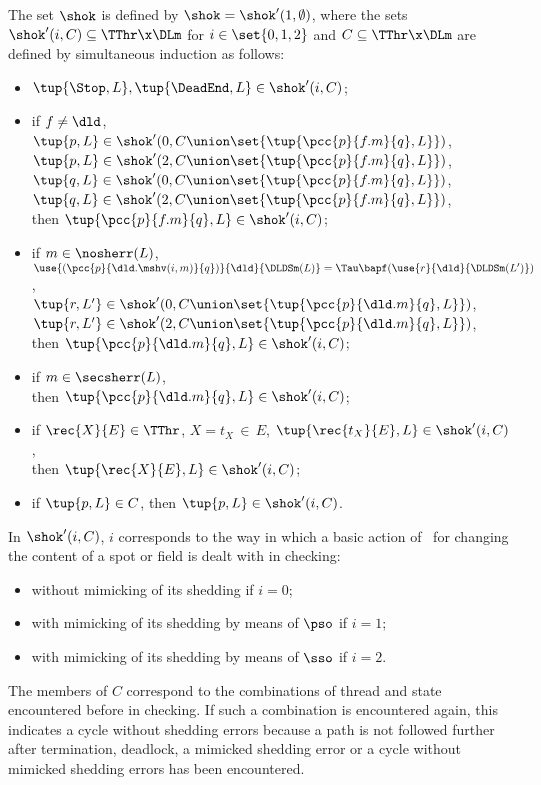 \documentclass[fleqn]{llncs}
\begin{document}
The set $\shok$ is defined by $\shok = \shok'(1,\emptyset)$, where the
sets $\shok'(i,C) \subseteq \TThr \x \DLm$ for $i \in \set{0,1,2}$ and
$C \subseteq \TThr \x \DLm$ are defined by simultaneous induction as
follows:
\begin{itemize}
\item
$\tup{\Stop,L}, \tup{\DeadEnd,L} \in \shok'(i,C)$;
\item
if $f \neq \dld$,
\\ \phantom{if}
$\tup{p,L} \in
 \shok'(0,C \union \set{\tup{\pcc{p}{f.m}{q},L}})$,
\\ \phantom{if}
$\tup{p,L} \in
 \shok'(2,C \union \set{\tup{\pcc{p}{f.m}{q},L}})$,
\\ \phantom{if}
$\tup{q,L} \in
 \shok'(0,C \union \set{\tup{\pcc{p}{f.m}{q},L}})$,
\\ \phantom{if}
$\tup{q,L} \in
 \shok'(2,C \union \set{\tup{\pcc{p}{f.m}{q},L}})$,
\\
then $\tup{\pcc{p}{f.m}{q},L} \in \shok'(i,C)$;
\item
if $m \in \nosherr(L)$,
\\ \phantom{if}
$\use{(\pcc{p}{\dld.\mshv(i,m)}{q})}{\dld}{\DLDSm(L)} =
 \Tau \bapf (\use{r}{\dld}{\DLDSm(L')})$,
\\ \phantom{if}
$\tup{r,L'} \in
 \shok'(0,C \union \set{\tup{\pcc{p}{\dld.m}{q},L}})$,
\\ \phantom{if}
$\tup{r,L'} \in
 \shok'(2,C \union \set{\tup{\pcc{p}{\dld.m}{q},L}})$,
\\
then $\tup{\pcc{p}{\dld.m}{q},L} \in \shok'(i,C)$;
\item
if $m \in \secsherr(L)$,
\\
then $\tup{\pcc{p}{\dld.m}{q},L} \in \shok'(i,C)$;
\item
if $\rec{X}{E} \in \TThr$, $X = t_X \,\in\, E$,
$\tup{\rec{t_X}{E},L} \in \shok'(i,C)$,
\\
then $\tup{\rec{X}{E},L} \in \shok'(i,C)$;
\item
if $\tup{p,L} \in C$, then $\tup{p,L} \in \shok'(i,C)$.
\end{itemize}

In $\shok'(i,C)$, $i$ corresponds to the way in which a basic action of
\DLD\ for changing the content of a spot or field is dealt with in
checking:
\begin{itemize}
\item
without mimicking of its shedding if $i = 0$;
\item
with mimicking of its shedding by means of $\pso$ if $i = 1$;
\item
with mimicking of its shedding by means of $\sso$ if $i = 2$.
\end{itemize}
The members of $C$ correspond to the combinations of thread and state
encountered before in checking.
If such a combination is encountered again, this indicates a cycle
without shedding errors because a path is not followed further after
termination, deadlock, a mimicked shedding error or a cycle without
mimicked shedding errors has been encountered.
\end{document}
